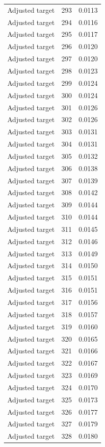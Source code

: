 \begin{table}[htbp]
\begin{tabular}{lll}
Adjusted target & 293 & 0.0113 \\
Adjusted target & 294 & 0.0116 \\
Adjusted target & 295 & 0.0117 \\
Adjusted target & 296 & 0.0120 \\
Adjusted target & 297 & 0.0120 \\
Adjusted target & 298 & 0.0123 \\
Adjusted target & 299 & 0.0124 \\
Adjusted target & 300 & 0.0124 \\
Adjusted target & 301 & 0.0126 \\
Adjusted target & 302 & 0.0126 \\
Adjusted target & 303 & 0.0131 \\
Adjusted target & 304 & 0.0131 \\
Adjusted target & 305 & 0.0132 \\
Adjusted target & 306 & 0.0138 \\
Adjusted target & 307 & 0.0139 \\
Adjusted target & 308 & 0.0142 \\
Adjusted target & 309 & 0.0144 \\
Adjusted target & 310 & 0.0144 \\
Adjusted target & 311 & 0.0145 \\
Adjusted target & 312 & 0.0146 \\
Adjusted target & 313 & 0.0149 \\
Adjusted target & 314 & 0.0150 \\
Adjusted target & 315 & 0.0151 \\
Adjusted target & 316 & 0.0151 \\
Adjusted target & 317 & 0.0156 \\
Adjusted target & 318 & 0.0157 \\
Adjusted target & 319 & 0.0160 \\
Adjusted target & 320 & 0.0165 \\
Adjusted target & 321 & 0.0166 \\
Adjusted target & 322 & 0.0167 \\
Adjusted target & 323 & 0.0169 \\
Adjusted target & 324 & 0.0170 \\
Adjusted target & 325 & 0.0173 \\
Adjusted target & 326 & 0.0177 \\
Adjusted target & 327 & 0.0179 \\
Adjusted target & 328 & 0.0180 \\

\end{tabular}
\end{table}
